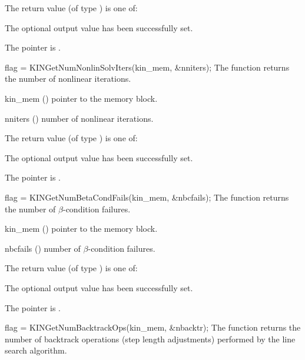 {
  The return value  (of type ) is one of:
  \begin{args}
  \item[\Id{KIN\_SUCCESS}] 
    The optional output value has been successfully set.
  \item[\Id{KIN\_MEM\_NULL}]
    The  pointer is .
  \end{args}
}
{}
{
  flag = KINGetNumNonlinSolvIters(kin\_mem, \&nniters);
}
{
  The function  returns the number
  of nonlinear iterations.
}
{
  \begin{args}
  \item[kin\_mem] ()
    pointer to the {\kinsol} memory block.
  \item[nniters] ()
    number of nonlinear iterations.
  \end{args}
}
{
  The return value  (of type ) is one of:
  \begin{args}
  \item[\Id{KIN\_SUCCESS}] 
    The optional output value has been successfully set.
  \item[\Id{KIN\_MEM\_NULL}]
    The  pointer is .
  \end{args}
}
{}
{
  flag = KINGetNumBetaCondFails(kin\_mem, \&nbcfails);
}
{
  The function  returns the number
  of $\beta$-condition failures.
}
{
  \begin{args}[nbcfails]
  \item[kin\_mem] ()
    pointer to the {\kinsol} memory block.
  \item[nbcfails] ()
    number of $\beta$-condition failures.
  \end{args}
}
{
  The return value  (of type ) is one of:
  \begin{args}
  \item[\Id{KIN\_SUCCESS}] 
    The optional output value has been successfully set.
  \item[\Id{KIN\_MEM\_NULL}]
    The  pointer is .
  \end{args}
}
{}
{
  flag = KINGetNumBacktrackOps(kin\_mem, \&nbacktr);
}
{
  The function  returns the number of
  backtrack operations (step length adjustments) performed by the
  line search algorithm.
}
